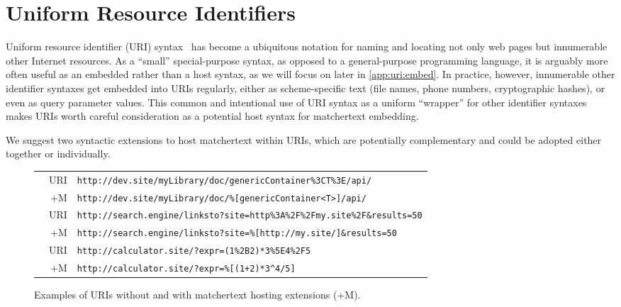 \section{Uniform Resource Identifiers}
\label{app:uri}

Uniform resource identifier (URI) syntax~\cite{rfc3986}
has become a ubiquitous notation for naming and locating
not only web pages but innumerable other Internet resources.
As a ``small'' special-purpose syntax,
as opposed to a general-purpose programming language,
it is arguably more often useful as an embedded rather than a host syntax,
as we will focus on later in \cref{app:uri:embed}.
In practice, however, innumerable other identifier syntaxes
get embedded into URIs regularly,
either as scheme-specific text
(\eg file names, phone numbers, cryptographic hashes),
or even as query parameter values.
This common and intentional use of URI syntax
as a uniform ``wrapper'' for other identifier syntaxes
makes URIs worth careful consideration as a potential host syntax
for matchertext embedding.

We suggest two syntactic extensions
to host matchertext within URIs,
which are potentially complementary
and could be adopted either together or individually.

\begin{figure}
\begin{center}
\begin{footnotesize}
\begin{tabular}{lrl}
& URI	& \verb|http://dev.site/myLibrary/doc/genericContainer%3CT%3E/api/| \\
& +M	& \verb|http://dev.site/myLibrary/doc/%[genericContainer<T>]/api/| \\
& URI	& \verb|http://search.engine/linksto?site=http%3A%2F%2Fmy.site%2F&results=50| \\
& +M	& \verb|http://search.engine/linksto?site=%[http://my.site/]&results=50| \\
& URI	& \verb|http://calculator.site/?expr=(1%2B2)*3%5E4%2F5| \\
& +M	& \verb|http://calculator.site/?expr=%[(1+2)*3^4/5]| \\
\end{tabular}
\end{footnotesize}
\end{center}
\caption{Examples of URIs without and with matchertext hosting extensions (+M).}
\label{fig:host:uri-examples}
\end{figure}

